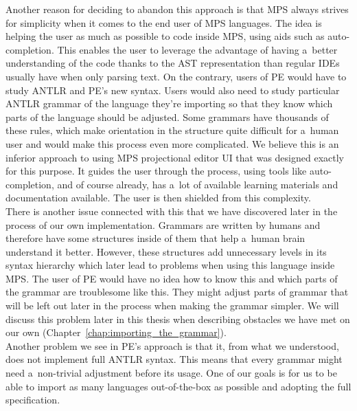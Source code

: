 Another reason for deciding to abandon this approach is that MPS always strives for simplicity when it comes to the end user of MPS languages.
The idea is helping the user as much as possible to code inside MPS, using aids such as auto-completion.
This enables the user to leverage the advantage of having a~better understanding of the code thanks to the AST representation than regular IDEs usually have when only parsing text.
On the contrary, users of PE would have to study ANTLR and PE's new syntax.
Users would also need to study particular ANTLR grammar of the language they're importing so that they know which parts of the language should be adjusted.
Some grammars have thousands of these rules, which make orientation in the structure quite difficult for a~human user and would make this process even more complicated.
We believe this is an inferior approach to using MPS projectional editor UI that was designed exactly for this purpose.
It guides the user through the process, using tools like auto-completion, and of course already, has a~lot of available learning materials and documentation available.
The user is then shielded from this complexity.
\\

There is another issue connected with this that we have discovered later in the process of our own implementation.
Grammars are written by humans and therefore have some structures inside of them that help a~human brain understand it better.
However, these structures add unnecessary levels in its syntax hierarchy which later lead to problems when using this language inside MPS.
The user of PE would have no idea how to know this and which parts of the grammar are troublesome like this.
They might adjust parts of grammar that will be left out later in the process when making the grammar simpler.
We will discuss this problem later in this thesis when describing obstacles we have met on our own (Chapter~\ref{chap:importing_the_grammar}).
\\

Another problem we see in PE's approach is that it, from what we understood, does not implement full ANTLR syntax.
This means that every grammar might need a~non-trivial adjustment before its usage.
One of our goals is for us to be able to import as many languages out-of-the-box as possible and adopting the full specification.
\\

